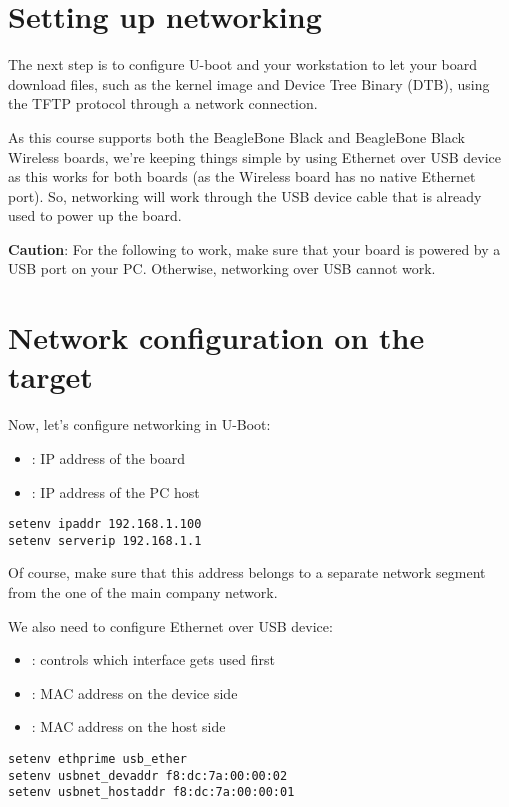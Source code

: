 \section{Setting up networking}

The next step is to configure U-boot and your workstation to let your
board download files, such as the kernel image and Device Tree Binary
(DTB), using the TFTP protocol through a network connection.

As this course supports both the BeagleBone Black and BeagleBone Black
Wireless boards, we're keeping things simple by using Ethernet over USB
device as this works for both boards (as the Wireless board has no
native Ethernet port). So, networking will work through the USB device
cable that is already used to power up the board.

{\bf Caution}: For the following to work, make sure that your board
is powered by a USB port on your PC. Otherwise, networking over USB
cannot work.

\section{Network configuration on the target}
Now, let's configure networking in U-Boot:

\begin{itemize}
  \item {}: IP address of the board
  \item {}: IP address of the PC host
\end{itemize}

\begin{verbatim}
setenv ipaddr 192.168.1.100
setenv serverip 192.168.1.1
\end{verbatim}

Of course, make sure that this address belongs to a separate network
segment from the one of the main company network.

We also need to configure Ethernet over USB device:
\begin{itemize}
  \item {}: controls which interface gets used first
  \item {}: MAC address on the device side
  \item {}: MAC address on the host side  
\end{itemize}

\begin{verbatim}
setenv ethprime usb_ether
setenv usbnet_devaddr f8:dc:7a:00:00:02
setenv usbnet_hostaddr f8:dc:7a:00:00:01
\end{verbatim}

